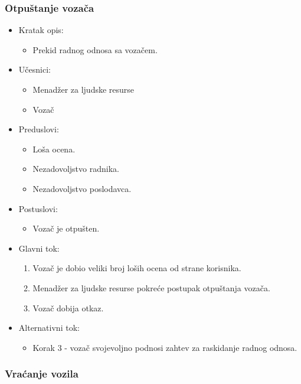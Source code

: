 \subsubsection{\bfseries Otpuštanje vozača}

\begin{itemize}
	\item Kratak opis:
		\begin{itemize}
			\item Prekid radnog odnosa sa vozačem.
		\end{itemize}
	\item Učesnici:
		\begin{itemize}
		    \item Menadžer za ljudske resurse
		    \item Vozač
		\end{itemize}
	\item Preduslovi:
		\begin{itemize}
		    \item Loša ocena.
		    \item Nezadovoljstvo radnika.
		    \item Nezadovoljstvo poslodavca.
		\end{itemize}
	\item Postuslovi:
		\begin{itemize}
			\item Vozač je otpušten.
	    \end{itemize}
	\item Glavni tok:
		\begin{enumerate}
		    \item Vozač je dobio veliki broj loših ocena od strane korisnika.
		    \item Menadžer za ljudske resurse pokreće postupak otpuštanja vozača.
		    \item Vozač dobija otkaz.
		\end{enumerate}
	\item Alternativni tok:
		\begin{itemize}
		    \item Korak 3 - vozač svojevoljno podnosi zahtev za raskidanje radnog odnosa.
		\end{itemize}
\end{itemize}


\subsubsection{\bfseries Vraćanje vozila}

